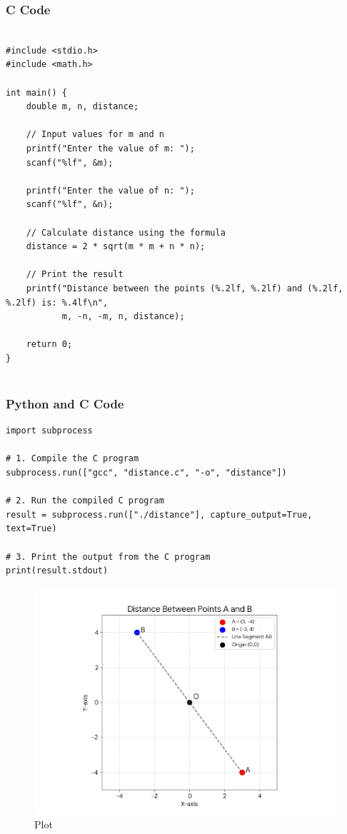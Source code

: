 \documentclass{beamer}
\begin{document}
\begin{frame}[fragile]
\frametitle{C Code}
\begin{lstlisting}
  
#include <stdio.h>
#include <math.h>

int main() {
    double m, n, distance;

    // Input values for m and n
    printf("Enter the value of m: ");
    scanf("%lf", &m);

    printf("Enter the value of n: ");
    scanf("%lf", &n);

    // Calculate distance using the formula
    distance = 2 * sqrt(m * m + n * n);

    // Print the result
    printf("Distance between the points (%.2lf, %.2lf) and (%.2lf, %.2lf) is: %.4lf\n",
           m, -n, -m, n, distance);

    return 0;
}


\end{lstlisting}

\end{frame}


\begin{frame}[fragile]
\frametitle{Python and C Code}

\begin{lstlisting}
import subprocess

# 1. Compile the C program
subprocess.run(["gcc", "distance.c", "-o", "distance"])

# 2. Run the compiled C program
result = subprocess.run(["./distance"], capture_output=True, text=True)

# 3. Print the output from the C program
print(result.stdout)
\end{lstlisting}

\end{frame}

\begin{figure}[H]
    \centering
    \includegraphics[width=0.7\columnwidth]{Fig.png}
    \caption{Plot}
    \label{fig:placeholder}
\end{figure}
\end{document}
